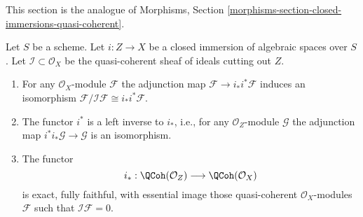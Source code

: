 \noindent
This section is the analogue of
Morphisms, Section \ref{morphisms-section-closed-immersions-quasi-coherent}.

\begin{lemma}
\label{lemma-i-star-equivalence}
Let $S$ be a scheme. Let $i : Z \to X$ be a closed immersion of algebraic
spaces over $S$. Let $\mathcal{I} \subset \mathcal{O}_X$ be the quasi-coherent
sheaf of ideals cutting out $Z$.
\begin{enumerate}
\item For any $\mathcal{O}_X$-module $\mathcal{F}$ the adjunction map
$\mathcal{F} \to i_*i^*\mathcal{F}$ induces an isomorphism
$\mathcal{F}/\mathcal{I}\mathcal{F} \cong i_*i^*\mathcal{F}$.
\item The functor $i^*$ is a left inverse to $i_*$, i.e., for any
$\mathcal{O}_Z$-module $\mathcal{G}$ the adjunction map
$i^*i_*\mathcal{G} \to \mathcal{G}$ is an isomorphism.
\item The functor
$$
i_* :
\QCoh(\mathcal{O}_Z)
\longrightarrow
\QCoh(\mathcal{O}_X)
$$
is exact, fully faithful, with essential image those quasi-coherent
$\mathcal{O}_X$-modules $\mathcal{F}$ such that $\mathcal{I}\mathcal{F} = 0$.
\end{enumerate}
\end{lemma}

